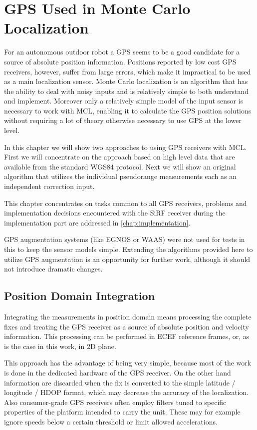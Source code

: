 \chapter{GPS Used in Monte Carlo Localization}
\label{chap:gps-and-mcl}

For an autonomous outdoor robot a GPS seems to be a good candidate for a source of
absolute position information.
Positions reported by low cost GPS receivers, however, suffer from large errors,
which make it impractical to be used as a main localization sensor.
Monte Carlo localization is an algorithm that has the ability to deal with noisy
inputs and is relatively simple to both understand and implement.
Moreover only a relatively simple model of the input sensor is necessary to work
with MCL, enabling it to calculate the GPS position solutions without requiring
a lot of theory otherwise necessary to use GPS at the lower level.

In this chapter we will show two approaches to using GPS receivers with MCL.
First we will concentrate on the approach based on high level data that are available
from the standard WGS84 protocol.
Next we will show an original algorithm that utilizes
the individual pseudorange measurements each as an independent correction input.

This chapter concentrates on tasks common to all GPS receivers,
problems and implementation decisions encountered with the SiRF receiver
during the implementation part are addressed in \cref{chap:implementation}.

GPS augmentation systems (like EGNOS or WAAS) were not used for tests in this
to keep the sensor models simple.
Extending the algorithms provided here to utilize GPS augmentation is an opportunity
for further work, although it should not introduce dramatic changes.

\section{Position Domain Integration}
\label{sec:position-domain}
Integrating the measurements in position domain means processing the complete
fixes and treating the GPS receiver as a source of absolute position and velocity information.
This processing can be performed in ECEF reference frames, or, as is the case in this work,
in 2D plane.

This approach has the advantage of being very simple, because most of the work
is done in the dedicated hardware of the GPS receiver.
On the other hand information are discarded when the fix is converted to the simple
latitude / longitude / HDOP format, which may decrease the accuracy of the
localization.
Also consumer-grade GPS receivers often employ filters tuned to specific properties
of the platform intended to carry the unit.
These may for example ignore speeds below a certain threshold or limit allowed accelerations.

